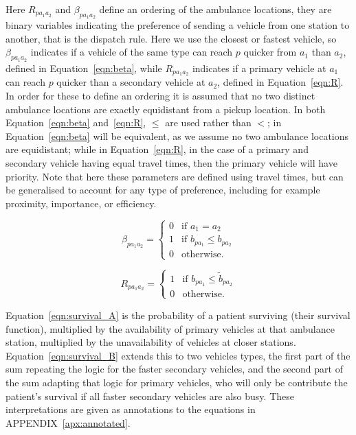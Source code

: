 \documentclass[numbers,webpdf,imaman]{ima-authoring-template}%
\begin{document}
Here $R_{p a_1 a_2}$ and $\beta_{p a_1 a_2}$ define an ordering
of the ambulance locations, they are binary variables indicating the preference
of sending a vehicle from one station to another, that is the dispatch rule.
Here we use the closest or fastest vehicle, so $\beta_{p a_1 a_2}$ indicates if
a vehicle of the same type can reach $p$ quicker from $a_1$ than $a_2$, defined
in Equation~\ref{eqn:beta}, while $R_{p a_1 a_2}$ indicates if a primary vehicle
at $a_1$ can reach $p$ quicker than a secondary vehicle at $a_2$, defined in
Equation~\ref{eqn:R}. In order for these to define an ordering
it is assumed that no two distinct ambulance locations are exactly equidistant
from a pickup location. In both Equation~\ref{eqn:beta} and~\ref{eqn:R}, $\leq$ are used rather than $<$; in Equation~\ref{eqn:beta} will be equivalent, as we assume no two ambulance locations are equidistant; while in Equation~\ref{eqn:R}, in the case of a primary and secondary vehicle having equal travel times, then the primary vehicle will have priority.
Note that here these parameters are defined using
travel times, but can be generalised to account for any type of preference,
including for example proximity, importance, or efficiency.

\begin{equation}\label{eqn:beta}
\beta_{p a_1 a_2} = \begin{cases}
    0 & \text{if } a_1 = a_2\\
    1 & \text{if } b_{p a_1} \leq b_{p a_2}\\
    0 & \text{otherwise.}
\end{cases}
\end{equation}

\begin{equation}\label{eqn:R}
R_{p a_1 a_2} = \begin{cases}
    1 & \text{if } b_{p a_1} \leq \tilde{b}_{p a_2}\\
    0 & \text{otherwise.}
\end{cases}
\end{equation}

Equation~\ref{eqn:survival_A} is the probability of a patient surviving (their
survival function), multiplied by the availability of primary vehicles at that
ambulance station, multiplied by the unavailability of vehicles at closer
stations.
Equation~\ref{eqn:survival_B} extends this to two vehicles types, the first
part of the sum repeating the logic for the faster secondary vehicles, and the
second part of the sum adapting that logic for primary vehicles, who will only
be contribute the patient's survival if all faster secondary vehicles are also
busy. These interpretations are given as annotations to the equations
in APPENDIX~\ref{apx:annotated}.
\end{document}
